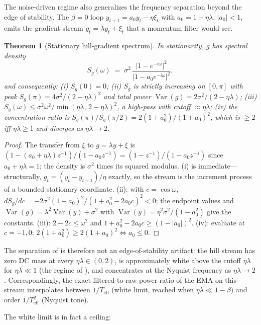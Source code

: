 \documentclass[11pt,a4paper]{article}
\newtheorem{theorem}{Theorem}
\theoremstyle{remark}
\newcommand{\Teff}{T_{\mathrm{eff}}}
\begin{document}
The noise-driven regime also generalizes the frequency separation beyond the edge of stability.
The $\beta=0$ loop $y_{t+1}=a_0y_t-\eta\xi_t$ with $a_0=1-\eta\lambda$, $\lvert a_0\rvert<1$, emits the gradient stream $g_t=\lambda y_t+\xi_t$ that a momentum filter would see.

\begin{theorem}[Stationary hill-gradient spectrum]
\label{thm:spectrum}
In stationarity, $g$ has spectral density
\[
S_g(\omega)\;=\;\sigma^2\,
\frac{\lvert1-e^{-i\omega}\rvert^2}{\lvert1-a_0e^{-i\omega}\rvert^2},
\]
and consequently: (i) $S_g(0)=0$; (ii) $S_g$ is strictly increasing on $[0,\pi]$ with peak $S_g(\pi)=4\sigma^2/(2-\eta\lambda)^2$ and total power $\operatorname{Var}(g)=2\sigma^2/(2-\eta\lambda)$; (iii) $S_g(\omega)\le\sigma^2\omega^2/\min(\eta\lambda,\,2-\eta\lambda)^2$, a high-pass with cutoff $\approx\eta\lambda$; (iv) the concentration ratio is $S_g(\pi)/S_g(\pi/2)=2(1+a_0^2)/(1+a_0)^2$, which is $\ge2$ iff $\eta\lambda\ge1$ and diverges as $\eta\lambda\to2$.
\end{theorem}

\begin{proof}
The transfer from $\xi$ to $g=\lambda y+\xi$ is $(1-(a_0+\eta\lambda)z^{-1})/(1-a_0z^{-1})=(1-z^{-1})/(1-a_0z^{-1})$ since $a_0+\eta\lambda=1$; the density is $\sigma^2$ times its squared modulus.
(i) is immediate---structurally, $g_t=(y_t-y_{t+1})/\eta$ exactly, so the stream is the increment process of a bounded stationary coordinate.
(ii): with $c=\cos\omega$, $dS_g/dc=-2\sigma^2(1-a_0)^2/(1+a_0^2-2a_0c)^2<0$; the endpoint values and $\operatorname{Var}(g)=\lambda^2\operatorname{Var}(y)+\sigma^2$ with $\operatorname{Var}(y)=\eta^2\sigma^2/(1-a_0^2)$ give the constants.
(iii): $2-2c\le\omega^2$ and $1+a_0^2-2a_0c\ge(1-\lvert a_0\rvert)^2$.
(iv): evaluate at $c=-1,0$; $2(1+a_0^2)\ge2(1+a_0)^2\Leftrightarrow a_0\le0$.
\end{proof}

The separation of  is therefore not an edge-of-stability artifact: the hill stream has zero DC mass at every $\eta\lambda\in(0,2)$, is approximately white above the cutoff $\eta\lambda$ for $\eta\lambda\ll1$ (the regime of \citealp{wen2024river}), and concentrates at the Nyquist frequency as $\eta\lambda\to2$.
Correspondingly, the exact filtered-to-raw power ratio of the EMA on this stream interpolates between $1/\Teff$ (white limit, reached when $\eta\lambda\ll1-\beta$) and order $1/\Teff^2$ (Nyquist tone).

The white limit is in fact a ceiling:
\end{document}
